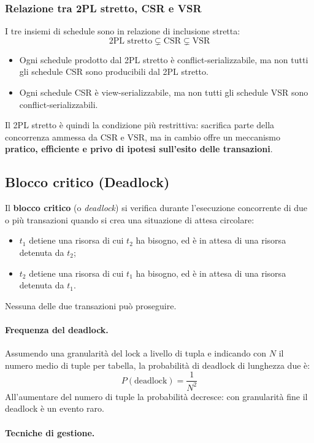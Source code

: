 \subsubsection{Relazione tra 2PL stretto, CSR e VSR}

I tre insiemi di schedule sono in relazione di inclusione stretta:
\[
\text{2PL stretto} \subsetneq \text{CSR} \subsetneq \text{VSR}
\]

\begin{itemize}
	\item Ogni schedule prodotto dal 2PL stretto è conflict-serializzabile, ma non tutti gli schedule CSR sono producibili dal 2PL stretto.
	\item Ogni schedule CSR è view-serializzabile, ma non tutti gli schedule VSR sono conflict-serializzabili.
\end{itemize}

Il 2PL stretto è quindi la condizione più restrittiva: sacrifica parte della concorrenza ammessa da CSR e VSR, ma in cambio offre un meccanismo \textbf{pratico, efficiente e privo di ipotesi sull'esito delle transazioni}.
\subsection{Blocco critico (Deadlock)}

Il \textbf{blocco critico} (o \textit{deadlock}) si verifica durante l'esecuzione concorrente di due o più transazioni quando si crea una situazione di attesa circolare:
\begin{itemize}
	\item $t_1$ detiene una risorsa di cui $t_2$ ha bisogno, ed è in attesa di una risorsa detenuta da $t_2$;
	\item $t_2$ detiene una risorsa di cui $t_1$ ha bisogno, ed è in attesa di una risorsa detenuta da $t_1$.
\end{itemize}
Nessuna delle due transazioni può proseguire.

\paragraph{Frequenza del deadlock.}
Assumendo una granularità del lock a livello di tupla e indicando con $N$ il numero medio di tuple per tabella, la probabilità di deadlock di lunghezza due è:
\[
P(\text{deadlock}) = \frac{1}{N^2}
\]
All'aumentare del numero di tuple la probabilità decresce: con granularità fine il deadlock è un evento raro.

\paragraph{Tecniche di gestione.}

